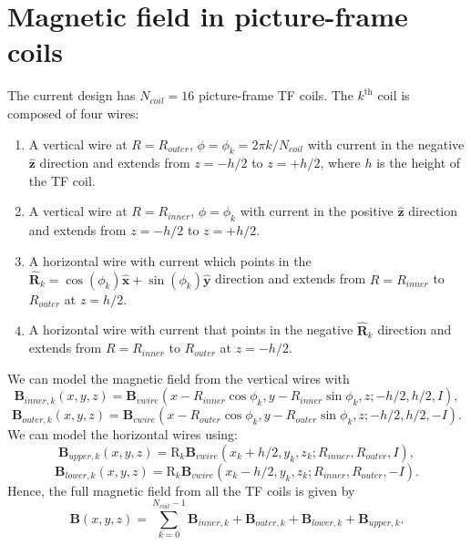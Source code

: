 \documentclass{article}
\begin{document}
\section{Magnetic field in picture-frame coils}

The current design has $N_{coil}=16$ picture-frame TF coils. The $k^{\text{th}}$ coil is composed of four wires:
\begin{enumerate}
    \item A vertical wire at $R=R_{outer}$, $\phi=\phi_k=2\pi k/N_{coil}$ with current in the negative $\mathbf{\hat{z}}$ direction and extends from $z=-h/2$ to $z=+h/2$, where $h$ is the height of the TF coil.
    \item  A vertical wire at $R=R_{inner}$, $\phi=\phi_k$ with current in the positive $\mathbf{\hat{z}}$ direction and extends from $z=-h/2$ to $z=+h/2$.
    \item A horizontal wire with current which points in the $\mathbf{\hat{R}}_k = \cos(\phi_k)\mathbf{\hat{x}}+\sin(\phi_k)\mathbf{\hat{y}}$ direction and extends from $R=R_{inner}$ to $R_{outer}$ at $z=h/2$.
    \item A horizontal wire with current that points in the negative $\mathbf{\hat{R}}_k$ direction and extends from $R=R_{inner}$ to $R_{outer}$ at $z=-h/2$.
\end{enumerate}
We can model the magnetic field from the vertical wires with 
\[\mathbf{B}_{inner,k}(x,y,z) = \mathbf{B}_{vwire}(x-R_{inner}\cos\phi_k, y-R_{inner}\sin{\phi_k}, z; -h/2, h/2, I),\]
\[\mathbf{B}_{outer,k}(x,y,z) = \mathbf{B}_{vwire}(x-R_{outer}\cos\phi_k, y-R_{outer}\sin{\phi_k}, z; -h/2, h/2, -I).\]
We can model the horizontal wires using:
\[\mathbf{B}_{upper,k}(x,y,z) = \text{R}_k\mathbf{B}_{vwire}(x_k + h/2, y_k, z_k; R_{inner}, R_{outer}, I),\]
\[\mathbf{B}_{lower,k}(x,y,z) = \text{R}_k\mathbf{B}_{vwire}(x_k - h/2, y_k, z_k; R_{inner}, R_{outer}, -I).\]
Hence, the full magnetic field from all the TF coils is given by
\[\boxed{\mathbf{B}(x, y, z) = \sum_{k=0}^{N_{coil}-1}\mathbf{B}_{inner,k} + \mathbf{B}_{outer,k} + \mathbf{B}_{lower,k} + \mathbf{B}_{upper,k}.}\]
\end{document}
